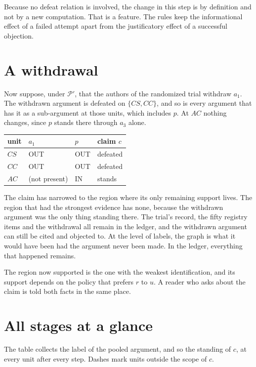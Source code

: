 \documentclass[11pt]{article}
\newcommand{\IN}{\textsf{IN}}
\newcommand{\OUT}{\textsf{OUT}}
\begin{document}
Because no defeat relation is involved, the change in this step is by definition and not by a new computation. That is a feature. The rules keep the informational effect of a failed attempt apart from the justificatory effect of a successful objection.

\section{A withdrawal}\label{sec:withdrawal}

Now suppose, under $\mathcal P'$, that the authors of the randomized trial withdraw $a_1$. The withdrawn argument is defeated on $\{CS,CC\}$, and so is every argument that has it as a sub-argument at those units, which includes $p$. At $AC$ nothing changes, since $p$ stands there through $a_3$ alone.

\begin{center}
\small
\begin{tabular}{@{}l l l l@{}}
\toprule
unit & $a_1$ & $p$ & claim $c$\\
\midrule
$CS$ & \OUT & \OUT & defeated\\
$CC$ & \OUT & \OUT & defeated\\
$AC$ & (not present) & \IN & stands\\
\bottomrule
\end{tabular}
\end{center}

The claim has narrowed to the region where its only remaining support lives. The region that had the strongest evidence has none, because the withdrawn argument was the only thing standing there. The trial's record, the fifty registry items and the withdrawal all remain in the ledger, and the withdrawn argument can still be cited and objected to. At the level of labels, the graph is what it would have been had the argument never been made. In the ledger, everything that happened remains.

The region now supported is the one with the weakest identification, and its support depends on the policy that prefers $r$ to $u$. A reader who asks about the claim is told both facts in the same place.

\section{All stages at a glance}\label{sec:glance}

The table collects the label of the pooled argument, and so the standing of $c$, at every unit after every step. Dashes mark units outside the scope of $c$.
\end{document}
